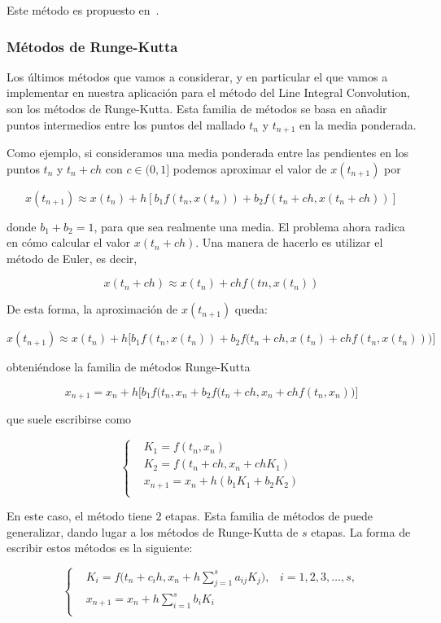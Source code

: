 Este método es propuesto en~\citet{osti_10185520}.

\subsubsection{Métodos de Runge-Kutta}
\label{makereference5.4.3.3}

Los últimos métodos que vamos a considerar, y en particular el que vamos a
implementar en nuestra aplicación para el método del Line Integral Convolution,
son los métodos de Runge-Kutta. Esta familia de métodos se basa en añadir puntos
intermedios entre los puntos del mallado $t_n$ y $t_{n+1}$ en la media
ponderada. 

Como ejemplo, si consideramos una media ponderada entre las pendientes en los
puntos $t_n$ y $t_n + ch$ con $c \in (0,1]$ podemos aproximar el valor de
$x(t_{n+1})$ por 

\[x(t_{n+1}) \approx x(t_n) + h\left[ b_1f(t_n,x(t_n)) + b_2f(t_n + ch,
x(t_n+ch))\right]\]

donde $b_1 + b_2 = 1$, para que sea realmente una media. El problema ahora
radica en cómo calcular el valor $x(t_n +ch)$. Una manera de hacerlo es utilizar
el método de Euler, es decir,

\[x(t_n + ch) \approx x(t_n) + chf(tn,x(t_n))\]

De esta forma, la aproximación de $x(t_{n+1})$ queda:

\[x(t_{n+1}) \approx x(t_n) + h\Big[ b_1f(t_n,x(t_n)) + b_2f\Big(t_n+ch,x(t_n) +
		chf(t_n,x(t_n))\Big)\Big] \]

obteniéndose la familia de métodos Runge-Kutta

\[ x_{n+1} = x_n + h\Big[b_1f(t_n,x_n + b_2f\Big(t_n + ch, x_n +
chf(t_n,x_n)\Big)\Big] \]

que suele escribirse como

\[ \left\{ 
		\begin{aligned}
		& K_1 = f(t_n,x_n) \\
		& K_2 = f(t_n + ch, x_n + chK_1) \\
		& x_{n+1} = x_n + h(b_1K_1 + b_2K_2) \\
		\end{aligned}
	\right. \]

En este caso, el método tiene $2$ etapas. Esta familia de métodos de puede
generalizar, dando lugar a los métodos de Runge-Kutta de $s$ etapas. La
forma de escribir estos métodos es la siguiente:

\begin{equation}
	\left\{	
		\begin{aligned}
			& K_i = f\bigg(t_n + c_ih,x_n + h\sum_{j=1}^sa_{ij}K_j\bigg),
			\;\;\; i=1,2,3,\ldots,s, \\
			& x_{n+1} = x_n + h\sum_{i=1}^sb_iK_i \\
		\end{aligned}
		\right.
\end{equation}

